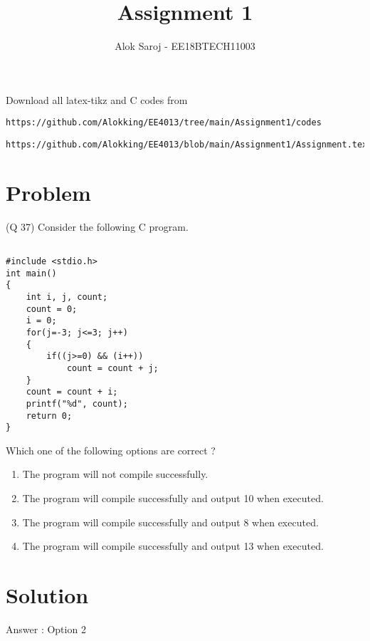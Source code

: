 \documentclass[journal,12pt,twocolumn]{IEEEtran}
\begin{document}
     \def\rightbox#1{\makebox[0in][r]{#1}}
     \def\centbox#1{\makebox[0in]{#1}}
     \def\topbox#1{\raisebox{-\baselineskip}[0in][0in]{#1}}
     \def\midbox#1{\raisebox{-0.5\baselineskip}[0in][0in]{#1}}
\vspace{3cm}
\title{Assignment 1}
\author{Alok Saroj - EE18BTECH11003}
\maketitle
\newpage
\bigskip
\renewcommand{\thefigure}{\theenumi}
\renewcommand{\thetable}{\theenumi}
Download all latex-tikz and C codes from 
%
\begin{lstlisting}
https://github.com/Alokking/EE4013/tree/main/Assignment1/codes
\end{lstlisting}
\begin{lstlisting}
https://github.com/Alokking/EE4013/blob/main/Assignment1/Assignment.tex
\end{lstlisting}
\section{Problem}
(Q 37) Consider the following C program.
\begin{lstlisting}

#include <stdio.h>
int main()
{
    int i, j, count;
    count = 0;
    i = 0;
    for(j=-3; j<=3; j++)
    {
        if((j>=0) && (i++))
            count = count + j;
    }
    count = count + i;
    printf("%d", count);
    return 0;
}

\end{lstlisting}

Which one of the following options are correct ? \vspace{0.1in}
\begin{enumerate}
\item The program will not compile successfully. 
\item The program will compile successfully and output 10 when executed.
\item The program will compile successfully and output 8 when executed.
\item The program will compile successfully and output 13 when executed. 
\end{enumerate}

\section{Solution}
Answer : Option 2
\end{document}

